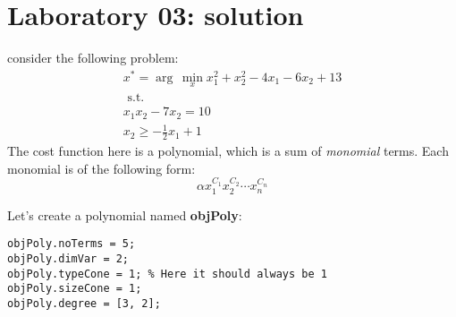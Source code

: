 \chapter{Laboratory 03: solution}
consider the following problem:
\[
\begin{array}{c}
x^* = \arg\,\min\limits_{x} x_1^2 + x_2^2 - 4x_1 - 6x_2 + 13\\
\text{ s.t. }\\[1em]
x_1x_2 - 7x_2 = 10\\ [1em]
x_2 \geq -\frac{1}{2}x_1 +1
\end{array}
\]
The cost function here is a polynomial, which is a sum of \textit{monomial} terms. Each monomial is of the following form:
\[
\alpha x_1^{C_1} x_2^{C_2} \cdots x_n^{C_n}
\]

Let's create a polynomial named \textbf{objPoly}:

\begin{example}
\begin{lstlisting}[caption=Defining the polynomial]
objPoly.noTerms = 5;
objPoly.dimVar = 2;
objPoly.typeCone = 1; % Here it should always be 1
objPoly.sizeCone = 1;
objPoly.degree = [3, 2];
\end{lstlisting}
\end{example}
